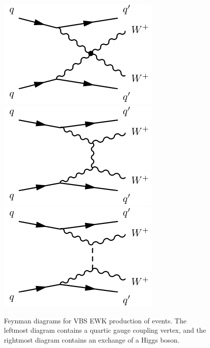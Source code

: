 \begin{figure}[htbp]
  \centering
  \includegraphics[width=.32\textwidth]{figs/ssww_13tev/diagrams/vbs1}
  \includegraphics[width=.32\textwidth]{figs/ssww_13tev/diagrams/vbs2}
  \includegraphics[width=.32\textwidth]{figs/ssww_13tev/diagrams/vbs3}
  \caption{Feynman diagrams for VBS EWK production of \ssww events. The leftmost diagram contains a quartic gauge coupling vertex, and the rightmost diagram contains an exchange of a Higgs boson. }
  \label{fig:ssww13tev_diagrams_vbs_ssww}
\end{figure}




